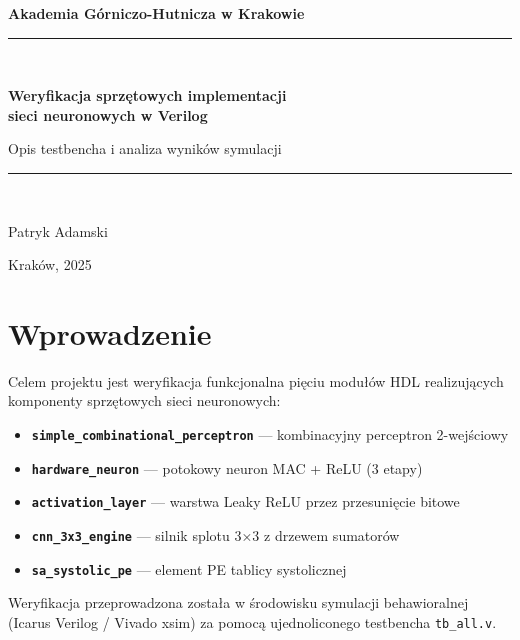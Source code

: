 \documentclass[12pt,a4paper]{article}
\begin{document}

\begin{titlepage}
  \centering
  \vspace*{2cm}
  {\Large\bfseries Akademia Górniczo-Hutnicza w Krakowie\par}
  \vspace{3cm}
  \rule{\linewidth}{0.5mm}\\[0.4cm]
  {\huge\bfseries Weryfikacja sprzętowych implementacji\\sieci neuronowych w Verilog\par}
  \vspace{0.2cm}
  {\large Opis testbencha i analiza wyników symulacji\par}
  \rule{\linewidth}{0.5mm}\\[1cm]
  \vspace{1cm}
  {\large Patryk Adamski\par}
  \vspace{0.3cm}
  {\large Kraków, 2025\par}
\end{titlepage}

\tableofcontents
\clearpage

\section{Wprowadzenie}

Celem projektu jest weryfikacja funkcjonalna pięciu modułów HDL realizujących komponenty sprzętowych sieci neuronowych:

\begin{itemize}
  \item \textbf{\texttt{simple\_combinational\_perceptron}} — kombinacyjny perceptron 2-wejściowy
  \item \textbf{\texttt{hardware\_neuron}} — potokowy neuron MAC + ReLU (3 etapy)
  \item \textbf{\texttt{activation\_layer}} — warstwa Leaky ReLU przez przesunięcie bitowe
  \item \textbf{\texttt{cnn\_3x3\_engine}} — silnik splotu 3×3 z drzewem sumatorów
  \item \textbf{\texttt{sa\_systolic\_pe}} — element PE tablicy systolicznej
\end{itemize}

Weryfikacja przeprowadzona została w środowisku symulacji behawioralnej (Icarus Verilog / Vivado xsim) za pomocą ujednoliconego testbencha \texttt{tb\_all.v}.
\end{document}
